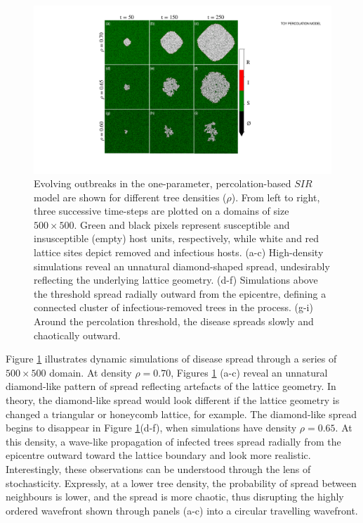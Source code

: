 \begin{figure}
    \centering
    \includegraphics[scale=0.50]{chapter3/figures/figure1-1param-perc.pdf}
    \caption{
        Evolving outbreaks in the one-parameter, percolation-based $SIR$ model are shown for different tree densities ($\rho$).
        From left to right, three successive time-steps are plotted on a domains of size $500 \times 500$.
        Green and black pixels represent susceptible and insusceptible (empty) host units, respectively, 
        while white and red lattice sites depict removed and infectious hosts. 
        (a-c) High-density simulations reveal an unnatural diamond-shaped spread, undesirably reflecting the underlying lattice geometry.
        (d-f) Simulations above the threshold spread radially outward from the epicentre, defining a connected cluster of infectious-removed trees in the process. (g-i) Around the percolation threshold, the disease spreads slowly and chaotically outward. 
        }
    \label{fig:ch3-perc-spread}
\end{figure}

Figure \ref{fig:ch3-perc-spread} illustrates dynamic simulations of disease spread through a series of $500 \times 500 $ domain. %
At density $\rho=0.70$, Figures \ref{fig:ch3-perc-spread} (a-c) reveal an unnatural diamond-like pattern of spread reflecting artefacts of the lattice geometry.
In theory, the diamond-like spread would look different if the lattice geometry is changed \textemdash a triangular or honeycomb lattice, for example.
The diamond-like spread begins to disappear in Figure \ref{fig:ch3-perc-spread}(d-f), when simulations have density $\rho=0.65$.
At this density, a wave-like propagation of infected trees spread radially from the epicentre outward toward the lattice boundary and look more realistic.
Interestingly, these observations can be understood through the lens of stochasticity. Expressly, at a lower tree density, the probability of spread between neighbours is lower, and the spread is more chaotic, thus disrupting the highly ordered wavefront shown through panels (a-c) into a circular travelling wavefront.

